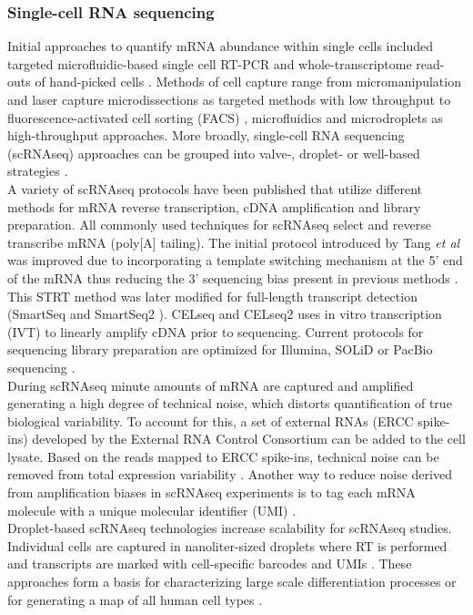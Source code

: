 \subsubsection{Single-cell RNA sequencing}

Initial approaches to quantify mRNA abundance within single cells included targeted microfluidic-based single cell RT-PCR \citep{Warren2006} and whole-transcriptome read-outs of hand-picked cells \citep{Tang2009}. Methods of cell capture range from micromanipulation \citep{Grindberg2014} and laser capture microdissections \citep{Frumkin2008} as targeted methods with low throughput to  fluorescence-activated cell sorting (FACS) \citep{Hayashi2010, Dalerba2011, Jaitin2014}, microfluidics \citep{Trapnell2014, Treutlein2014} and microdroplets \citep{Klein2015, Macosko2015} as high-throughput approaches. More broadly, single-cell RNA sequencing (scRNAseq) approaches can be grouped into valve-, droplet- or well-based strategies \citep{Prakadan2017}.\\
A variety of scRNAseq protocols have been published that utilize different methods for mRNA reverse transcription, cDNA amplification and library preparation. All commonly used techniques for scRNAseq select and reverse transcribe mRNA (poly[A] tailing). The initial protocol introduced by Tang \textit{et al} \citep{Tang2009} was improved due to incorporating a template switching mechanism at the 5' end of the mRNA thus reducing the 3' sequencing bias present in previous methods \citep{Islam2011}. This STRT method was later modified for full-length transcript detection (SmartSeq \citep{Ramskold2012} and SmartSeq2 \citep{Picelli2013}). CELseq \citep{Hashimshony2012} and CELseq2 \citep{Hashimshony2016} uses in vitro transcription (IVT) to linearly amplify cDNA prior to sequencing. Current protocols for sequencing library preparation are optimized for Illumina, SOLiD or PacBio sequencing \citep{Kolodziejczyk2015}. \\
During scRNAseq minute amounts of mRNA are captured and amplified generating a high degree of technical noise, which distorts quantification of true biological variability. To account for this, a set of external RNAs (ERCC spike-ins) developed by the External RNA Control Consortium \citep{Rna2005} can be added to the cell lysate. Based on the reads mapped to ERCC spike-ins, technical noise can be removed from total expression variability \citep{Brennecke2013, Vallejos2015}. Another way to reduce noise derived from amplification biases in scRNAseq experiments is to tag each mRNA molecule with a unique molecular identifier (UMI) \citep{Kivioja2011, Islam2014}.\\ 
Droplet-based scRNAseq technologies increase scalability for scRNAseq studies. Individual cells are captured in nanoliter-sized droplets where RT is performed and transcripts are marked with cell-specific barcodes and UMIs \citep{Klein2015, Macosko2015}. These approaches form a basis for characterizing large scale differentiation processes \citep{Ibarra-Soria2018a} or for generating a map of all human cell types \citep{Regev2017}.

